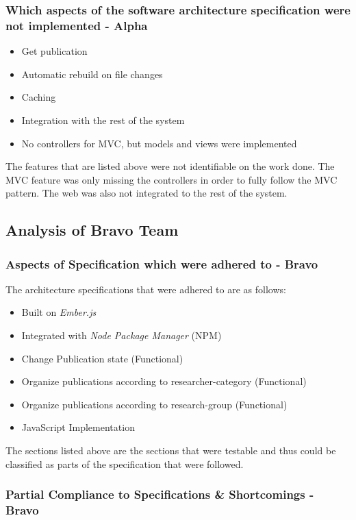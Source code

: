 \documentclass[english]{article}
\begin{document}
\subsubsection{Which aspects of the software architecture specification were not implemented - Alpha}	
\begin{itemize}
	\item Get publication
	\item Automatic rebuild on file changes
	\item Caching
	\item Integration with the rest of the system
	\item No controllers for MVC, but models and views were implemented
\end{itemize}
The features that are listed above were not identifiable on the work done. The MVC feature was only missing the controllers in order to fully follow the MVC pattern. The web was also not integrated to the rest of the system.

\subsection{Analysis of Bravo Team}

\subsubsection{Aspects of Specification which were adhered to - Bravo}
	The architecture specifications that were adhered to are as follows:
	\begin{itemize}
		\item Built on \textit{Ember.js}
		\item Integrated with \textit{Node Package Manager} (NPM)
		\item Change Publication state (Functional)
		\item Organize publications according to researcher-category (Functional)
		\item Organize publications according to research-group (Functional)
		\item JavaScript Implementation
	\end{itemize}
	
The sections listed above are the sections that were testable and thus could be classified as parts of the specification that were followed.

\subsubsection{Partial Compliance to Specifications \& Shortcomings - Bravo}
\end{document}
